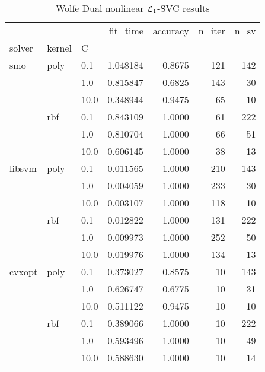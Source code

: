 \begin{table}[H]
\centering
\caption{Wolfe Dual nonlinear $\protect \mathcal{L}_1$-SVC results}
\label{nonlinear_dual_l1_svc_cv_results}
\begin{tabular}{lllrrrr}
\toprule
       &     &      &  fit\_time &  accuracy &  n\_iter &  n\_sv \\
solver & kernel & C &           &           &         &       \\
\midrule
smo & poly & 0.1  &  1.048184 &    0.8675 &     121 &   142 \\
       &     & 1.0  &  0.815847 &    0.6825 &     143 &    30 \\
       &     & 10.0 &  0.348944 &    0.9475 &      65 &    10 \\
       & rbf & 0.1  &  0.843109 &    1.0000 &      61 &   222 \\
       &     & 1.0  &  0.810704 &    1.0000 &      66 &    51 \\
       &     & 10.0 &  0.606145 &    1.0000 &      38 &    13 \\
libsvm & poly & 0.1  &  0.011565 &    1.0000 &     210 &   143 \\
       &     & 1.0  &  0.004059 &    1.0000 &     233 &    30 \\
       &     & 10.0 &  0.003107 &    1.0000 &     118 &    10 \\
       & rbf & 0.1  &  0.012822 &    1.0000 &     131 &   222 \\
       &     & 1.0  &  0.009973 &    1.0000 &     252 &    50 \\
       &     & 10.0 &  0.019976 &    1.0000 &     134 &    13 \\
cvxopt & poly & 0.1  &  0.373027 &    0.8575 &      10 &   143 \\
       &     & 1.0  &  0.626747 &    0.6775 &      10 &    31 \\
       &     & 10.0 &  0.511122 &    0.9475 &      10 &    10 \\
       & rbf & 0.1  &  0.389066 &    1.0000 &      10 &   222 \\
       &     & 1.0  &  0.593496 &    1.0000 &      10 &    49 \\
       &     & 10.0 &  0.588630 &    1.0000 &      10 &    14 \\
\bottomrule
\end{tabular}
\end{table}
